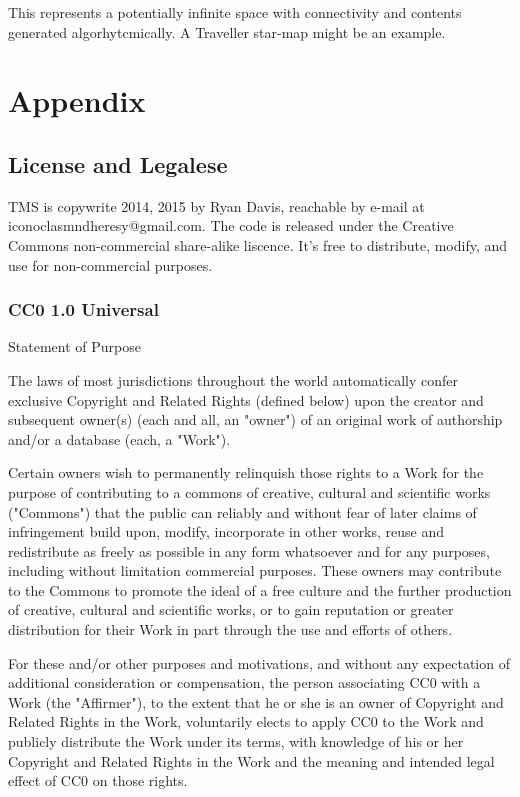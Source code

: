 \documentclass[10pt,letterpaper,twoside]{book}
\begin{document}
This represents a potentially infinite space with connectivity and contents generated algorhytcmically.
A Traveller star-map might be an example.

\backmatter
\part{Appendix}
\chapter{License and Legalese}
TMS is copywrite 2014, 2015 by Ryan Davis, reachable by e-mail at iconoclasmndheresy@gmail.com.
The code is released under the Creative Commons non-commercial share-alike liscence. It's free to distribute, modify, and use for non-commercial purposes.


\section{CC0 1.0 Universal}

Statement of Purpose

The laws of most jurisdictions throughout the world automatically confer
exclusive Copyright and Related Rights (defined below) upon the creator and
subsequent owner(s) (each and all, an "owner") of an original work of
authorship and/or a database (each, a "Work").

Certain owners wish to permanently relinquish those rights to a Work for the
purpose of contributing to a commons of creative, cultural and scientific
works ("Commons") that the public can reliably and without fear of later
claims of infringement build upon, modify, incorporate in other works, reuse
and redistribute as freely as possible in any form whatsoever and for any
purposes, including without limitation commercial purposes. These owners may
contribute to the Commons to promote the ideal of a free culture and the
further production of creative, cultural and scientific works, or to gain
reputation or greater distribution for their Work in part through the use and
efforts of others.

For these and/or other purposes and motivations, and without any expectation
of additional consideration or compensation, the person associating CC0 with a
Work (the "Affirmer"), to the extent that he or she is an owner of Copyright
and Related Rights in the Work, voluntarily elects to apply CC0 to the Work
and publicly distribute the Work under its terms, with knowledge of his or her
Copyright and Related Rights in the Work and the meaning and intended legal
effect of CC0 on those rights.
\end{document}
